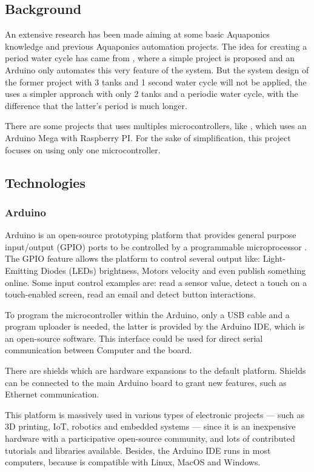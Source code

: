 \subsection{Background}

An extensive research has been made aiming at some basic Aquaponics knowledge and previous Aquaponics automation projects.
The idea for creating a period water cycle has came from \cite{simpleArduinoAquaponics},
where a simple project is proposed and an Arduino only automates this very feature of the system.
But the system design of the former project with 3 tanks and 1 second water cycle will not be applied,
the \cite{Kretzinger2015} uses a simpler approach with only 2 tanks and a periodic water cycle,
with the difference that the latter's period is much longer.

There are some projects that uses multiples microcontrollers,
like \cite{GarethColeman2014},
which uses an Arduino Mega with Raspberry PI.
For the sake of simplification,
this project focuses on using only one microcontroller.

\subsection{Technologies}
\subsubsection{Arduino}
Arduino is an open-source prototyping platform that provides general purpose input/output (GPIO) ports to be controlled by a programmable microprocessor \cite{arduino_intro}.
The GPIO feature allows the platform to control several output like: Light-Emitting Diodes (LEDs) brightness,
Motors velocity and even publish something online.
Some input control examples are: read a sensor value,
detect a touch on a touch-enabled screen, 
read an email and detect button interactions.

To program the microcontroller within the Arduino,
only a USB cable and a program uploader is needed,
the latter is provided by the Arduino IDE,
which is an open-source software.
This interface could be used for direct serial communication between Computer and the board.

There are shields which are hardware expansions to the default platform.
Shields can be connected to the main Arduino board to grant new features,
such as Ethernet communication.

This platform is massively used in various types of electronic projects ---
such as 3D printing, IoT, robotics and embedded systems ---
since it is an inexpensive hardware with a participative open-source community,
and lots of contributed tutorials and libraries available.
Besides,
the Arduino IDE runs in most computers,
because is compatible with Linux, MacOS and Windows.

